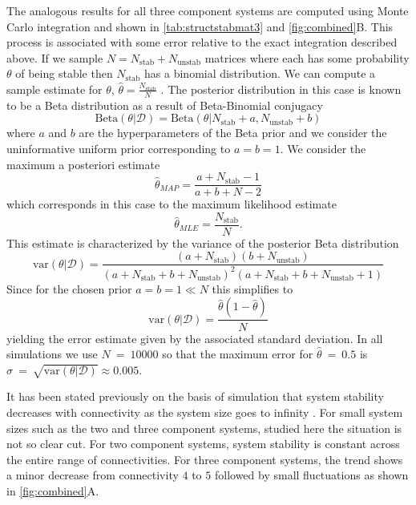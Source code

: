 The analogous results for all three component systems are computed using Monte Carlo integration and shown in \ref{tab:structstabmat3} and \ref{fig:combined}B. This process is associated with some error relative to the exact integration described above. If we sample $N = N_{\mathrm{stab}} + N_{\mathrm{unstab}}$ matrices where each has some probability $\theta$ of being stable then $N_{\mathrm{stab}}$ has a binomial distribution. We can compute a sample estimate for $\theta$, $\hat{\theta} = \frac{N_{\mathrm{stab}}}{N}$ \cite{Murphy2012}. The posterior distribution in this case is known to be a Beta distribution as a result of Beta-Binomial conjugacy
$$
\mathrm{Beta}(\theta | \mathcal{D}) = \mathrm{Beta}(\theta | N_{\mathrm{stab}} + a, N_{\mathrm{unstab}} + b)
$$
where $a$ and $b$ are the hyperparameters of the Beta prior and we consider the uninformative uniform prior corresponding to $a=b=1$. We consider the maximum a posteriori estimate
$$\hat{\theta}_{MAP} = \frac{a + N_{\mathrm{stab}} - 1}{a + b + N - 2}$$
which corresponds in this case to the maximum likelihood estimate
$$
\hat{\theta}_{MLE} = \frac{N_{\mathrm{stab}}}{N}.
$$
This estimate is characterized by the variance of the posterior Beta distribution
$$
\mathrm{var}(\theta | \mathcal{D}) = \frac{(a+N_{\mathrm{stab}})(b+N_{\mathrm{unstab}})}{(a + N_{\mathrm{stab}} + b + N_{\mathrm{unstab}})^2(a + N_{\mathrm{stab}} + b + N_{\mathrm{unstab}}+1)}
$$
Since for the chosen prior $a=b=1 \ll N$ this simplifies to
$$
\mathrm{var}(\theta | \mathcal{D}) = \frac{\hat{\theta}(1-\hat{\theta})}{N}
$$
yielding the error estimate given by the associated standard deviation. In all simulations we use $N~=~10000$ so that the maximum error for $\hat{\theta}~=~0.5$ is $\sigma~=~\sqrt{\mathrm{var}(\theta | \mathcal{D})} \approx 0.005$.

It has been stated previously on the basis of simulation that system stability decreases with connectivity as the system size goes to infinity \cite{May1972}. For small system sizes such as the two and three component systems, studied here the situation is not so clear cut. For two component systems, system stability is constant across the entire range of connectivities. For three component systems, the trend shows a minor decrease from connectivity $4$ to $5$ followed by small fluctuations as shown in \ref{fig:combined}A.

